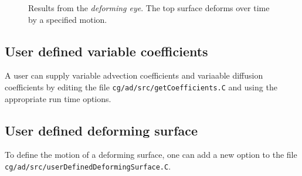 \documentclass[11pt]{article}
\begin{document}
{
\begin{figure}[hbt]
\newcommand{\figWidth}{8.cm}
\newcommand{\trimfig}[2]{\trimFig{#1}{#2}{0.1}{0.05}{.3}{.4}}
\begin{center}
\end{center}
\caption{Results from the {\em  deforming eye}. The top surface deforms over time by a specified motion.}
\label{fig:deformingEye}
\end{figure}
}



\clearpage
\subsection{User defined variable coefficients} \label{sec:userDefinedVariableCoefficients}

A user can supply variable advection coefficients and variaable diffusion coefficients
by editing the file {\tt cg/ad/src/getCoefficients.C} and using the appropriate
run time options. 


\subsection{User defined deforming surface} \label{sec:userDefinedDeformingSurface}

To define the motion of a deforming surface, one can add a new option to the
file {\tt cg/ad/src/userDefinedDeformingSurface.C}. 
\end{document}
